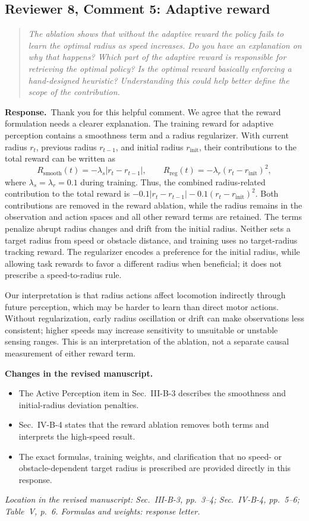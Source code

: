\documentclass[11pt]{article}
\newenvironment{reviewcomment}{\begin{quote}\color{reviewblue}\itshape}{\end{quote}}
\newcommand{\Response}{\par\noindent\textbf{Response.}\ }
\newcommand{\Changes}{\par\noindent\textbf{Changes in the revised manuscript.}\ }
\newcommand{\Location}[1]{\par\noindent\textit{Location in the revised manuscript: #1}}
\begin{document}
\subsection*{Reviewer 8, Comment 5: Adaptive reward}
\begin{reviewcomment}
The ablation shows that without the adaptive reward the policy fails to learn the optimal radius as speed increases. Do you have an explanation on why that happens? Which part of the adaptive reward is responsible for retrieving the optimal policy? Is the optimal reward basically enforcing a hand-designed heuristic? Understanding this could help better define the scope of the contribution.
\end{reviewcomment}
\Response Thank you for this helpful comment. We agree that the reward formulation needs a clearer explanation. The training reward for adaptive perception contains a smoothness term and a radius regularizer. With current radius $r_t$, previous radius $r_{t-1}$, and initial radius $r_{\mathrm{init}}$, their contributions to the total reward can be written as
\[
R_{\mathrm{smooth}}(t)=-\lambda_s|r_t-r_{t-1}|,\qquad
R_{\mathrm{reg}}(t)=-\lambda_r(r_t-r_{\mathrm{init}})^2,
\]
where $\lambda_s=\lambda_r=0.1$ during training. Thus, the combined radius-related contribution to the total reward is $-0.1|r_t-r_{t-1}|-0.1(r_t-r_{\mathrm{init}})^2$. Both contributions are removed in the reward ablation, while the radius remains in the observation and action spaces and all other reward terms are retained. The terms penalize abrupt radius changes and drift from the initial radius. Neither sets a target radius from speed or obstacle distance, and training uses no target-radius tracking reward. The regularizer encodes a preference for the initial radius, while allowing task rewards to favor a different radius when beneficial; it does not prescribe a speed-to-radius rule.

Our interpretation is that radius actions affect locomotion indirectly through future perception, which may be harder to learn than direct motor actions. Without regularization, early radius oscillation or drift can make observations less consistent; higher speeds may increase sensitivity to unsuitable or unstable sensing ranges. This is an interpretation of the ablation, not a separate causal measurement of either reward term.
\Changes
\begin{itemize}
    \item The Active Perception item in Sec.~III-B-3 describes the smoothness and initial-radius deviation penalties.
    \item Sec.~IV-B-4 states that the reward ablation removes both terms and interprets the high-speed result.
    \item The exact formulas, training weights, and clarification that no speed- or obstacle-dependent target radius is prescribed are provided directly in this response.
\end{itemize}
\Location{Sec.~III-B-3, pp.~3--4; Sec.~IV-B-4, pp.~5--6; Table~V, p.~6. Formulas and weights: response letter.}
\end{document}
